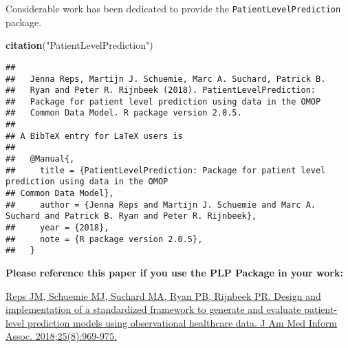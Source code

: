 \documentclass[]{article}
\newenvironment{Shaded}{\begin{snugshade}}{\end{snugshade}}
\newcommand{\KeywordTok}[1]{\textcolor[rgb]{0.13,0.29,0.53}{\textbf{#1}}}
\newcommand{\StringTok}[1]{\textcolor[rgb]{0.31,0.60,0.02}{#1}}
\newcommand{\NormalTok}[1]{#1}
\begin{document}
Considerable work has been dedicated to provide the
\texttt{PatientLevelPrediction} package.

\begin{Shaded}
\begin{Highlighting}[]
\KeywordTok{citation}\NormalTok{(}\StringTok{"PatientLevelPrediction"}\NormalTok{)}
\end{Highlighting}
\end{Shaded}

\begin{verbatim}
## 
##   Jenna Reps, Martijn J. Schuemie, Marc A. Suchard, Patrick B.
##   Ryan and Peter R. Rijnbeek (2018). PatientLevelPrediction:
##   Package for patient level prediction using data in the OMOP
##   Common Data Model. R package version 2.0.5.
## 
## A BibTeX entry for LaTeX users is
## 
##   @Manual{,
##     title = {PatientLevelPrediction: Package for patient level prediction using data in the OMOP
## Common Data Model},
##     author = {Jenna Reps and Martijn J. Schuemie and Marc A. Suchard and Patrick B. Ryan and Peter R. Rijnbeek},
##     year = {2018},
##     note = {R package version 2.0.5},
##   }
\end{verbatim}

\textbf{Please reference this paper if you use the PLP Package in your
work:}

\href{http://dx.doi.org/10.1093/jamia/ocy032}{Reps JM, Schuemie MJ,
Suchard MA, Ryan PB, Rijnbeek PR. Design and implementation of a
standardized framework to generate and evaluate patient-level prediction
models using observational healthcare data. J Am Med Inform Assoc.
2018;25(8):969-975.}
\end{document}
